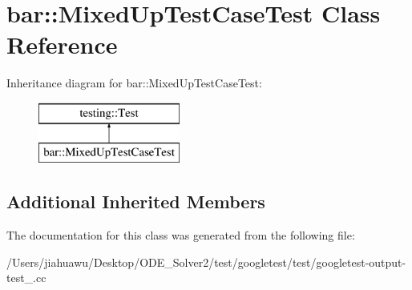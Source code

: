 \hypertarget{classbar_1_1_mixed_up_test_case_test}{}\section{bar\+:\+:Mixed\+Up\+Test\+Case\+Test Class Reference}
\label{classbar_1_1_mixed_up_test_case_test}
Inheritance diagram for bar\+:\+:Mixed\+Up\+Test\+Case\+Test\+:\begin{figure}[H]
\begin{center}
\leavevmode
\includegraphics[height=2.000000cm]{classbar_1_1_mixed_up_test_case_test}
\end{center}
\end{figure}
\subsection*{Additional Inherited Members}


The documentation for this class was generated from the following file\+:\begin{DoxyCompactItemize}
\item 
/\+Users/jiahuawu/\+Desktop/\+O\+D\+E\+\_\+\+Solver2/test/googletest/test/googletest-\/output-\/test\+\_\+.\+cc\end{DoxyCompactItemize}
